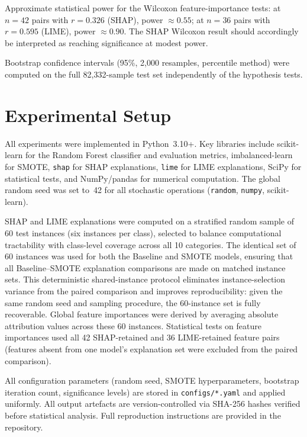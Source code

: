 \documentclass[conference,a4paper]{IEEEtran}
\newcommand{\SMOTE}{SMOTE\xspace}
\begin{document}
Approximate statistical power for the Wilcoxon feature-importance tests: at
$n=42$ pairs with $r=0.326$ (SHAP), power $\approx 0.55$; at $n=36$ pairs
with $r=0.595$ (LIME), power $\approx 0.90$. The SHAP Wilcoxon result should
accordingly be interpreted as reaching significance at modest power.

Bootstrap confidence intervals (95\%, 2,000 resamples, percentile method) were
computed on the full 82,332-sample test set independently of the hypothesis tests.

\section{Experimental Setup}
\label{sec:setup}

All experiments were implemented in Python~3.10+. Key libraries include
scikit-learn \cite{pedregosa2011} for the Random Forest classifier and evaluation
metrics, imbalanced-learn \cite{lemaitre2017} for \SMOTE, \texttt{shap} \cite{lundberg2017}
for SHAP explanations, \texttt{lime} \cite{ribeiro2016} for LIME explanations,
SciPy \cite{virtanen2020} for statistical tests, and NumPy/pandas for numerical
computation. The global random seed was set to~42 for all stochastic operations
(\texttt{random}, \texttt{numpy}, scikit-learn).

SHAP and LIME explanations were computed on a stratified random sample of 60 test
instances (six instances per class), selected to balance computational tractability
with class-level coverage across all 10 categories. The identical set of 60
instances was used for both the Baseline and SMOTE models, ensuring that all
Baseline--SMOTE explanation comparisons are made on matched instance sets. This
deterministic shared-instance protocol eliminates instance-selection variance from
the paired comparison and improves reproducibility: given the same random seed and
sampling procedure, the 60-instance set is fully recoverable. Global feature
importances were derived by averaging absolute attribution values across these 60
instances. Statistical tests on feature importances used all 42 SHAP-retained and
36 LIME-retained feature pairs (features absent from one model's explanation set
were excluded from the paired comparison).

All configuration parameters (random seed, SMOTE hyperparameters, bootstrap
iteration count, significance levels) are stored in \texttt{configs/*.yaml} and
applied uniformly. All output artefacts are version-controlled via SHA-256 hashes
verified before statistical analysis. Full reproduction instructions are provided
in the repository.
\end{document}

